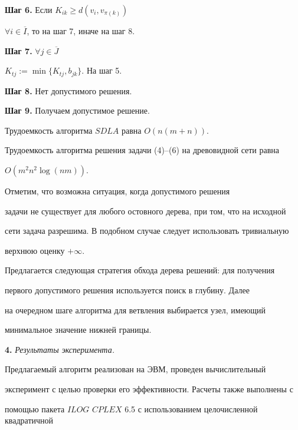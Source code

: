 {\bf Шаг 6.} Если $K_{ik} \geq d(v_{i},v_{\pi(k)})$


$\forall i \in \overline{I}$, то на шаг 7, иначе на шаг 8.





{\bf Шаг 7.} $\forall j \in \overline{J}$


$K_{tj}:=\min\{K_{tj},b_{jk}\}$. На шаг 5.





{\bf Шаг 8.} Нет допустимого решения.





{\bf Шаг 9.} Получаем допустимое решение.





Трудоемкость алгоритма $SDLA$ равна $O(n(m+n))$.


Трудоемкость алгоритма решения задачи (4)--(6) на древовидной сети равна


$O(m^2n^2\log(nm))$.





Отметим, что возможна ситуация, когда допустимого решения


задачи не существует для любого остовного дерева, при том, что на исходной


сети задача разрешима. В подобном случае следует использовать тривиальную


верхнюю оценку $+\infty$.





Предлагается следующая стратегия обхода дерева решений: для получения


первого допустимого решения используется поиск в глубину. Далее


на очередном шаге алгоритма для ветвления выбирается узел, имеющий


минимальное значение нижней границы.


\medskip





{\bf 4.} {\it Результаты эксперимента.}


Предлагаемый алгоритм реализован на ЭВМ, проведен вычислительный


эксперимент с целью проверки его эффективности. Расчеты также выполнены с


помощью пакета $ILOG$ $CPLEX$ 6.5 с использованием целочисленной квадратичной


